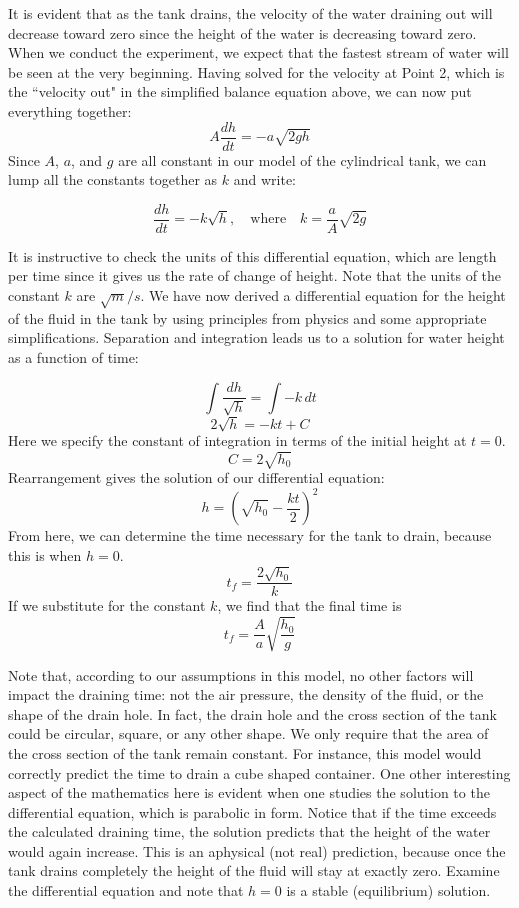\documentclass{ximera}
\begin{document}
 It is evident that as the tank drains, the velocity of the water draining out will decrease toward zero since the height of the water is decreasing toward zero.  When we conduct the experiment, we expect that the fastest stream of water will be seen at the very beginning.  Having solved for the velocity at Point 2, which is the ``velocity out" in the simplified balance equation above, we can now put everything together:
 $$A\frac{dh}{dt}=-a\sqrt{2gh}$$
 Since $A$, $a$, and $g$ are all constant in our model of the cylindrical tank, we can lump all the constants together as $k$ and write:
  
 $$\frac{dh}{dt}=-k\sqrt{h},\quad \text{where}\quad k=\frac{a}{A}\sqrt{2g}$$
 
It is instructive to check the units of this differential equation, which are length per time since it gives us the rate of change of height.  Note that the units of the constant $k$ are $\sqrt{m}/s$.  We have now derived a differential equation for the height of the fluid in the tank by using principles from physics and some appropriate simplifications. 
Separation and integration leads us to a solution for water height as a function of time:
 
$$\int\frac{dh}{\sqrt{h}}=\int -k\,dt$$
$$2\sqrt{h}=-kt+C$$
Here we specify the constant of integration in terms of the initial height at $t=0$.
$$C=2\sqrt{h_0}$$
Rearrangement gives the solution of our differential equation:
$$h=\left(\sqrt{h_0}-\frac{kt}{2}\right)^2$$
From here, we can determine the time necessary for the tank to drain, because this is when $h=0$.
$$t_f=\frac{2\sqrt{h_0}}{k}$$
If we substitute for the constant $k$, we find that the final time is
$$t_f=\frac{A}{a}\sqrt{\frac{h_0}{g}}$$

Note that, according to our assumptions in this model, no other factors will impact the draining time: not the air pressure, the density of the fluid, or the shape of the drain hole.  In fact, the drain hole and the cross section of the tank could be circular, square, or any other shape.  We only require that the area of the cross section of the tank remain constant.  For instance, this model would correctly predict the time to drain a cube shaped container.
One other interesting aspect of the mathematics here is evident when one studies the solution to the differential equation, which is parabolic in form.  Notice that if the time exceeds the calculated draining time, the solution predicts that the height of the water would again increase.  This is an aphysical (not real) prediction, because once the tank drains completely the height of the fluid will stay at exactly zero.  Examine the differential equation and note that $h=0$ is a stable (equilibrium) solution.
 
\end{document}
